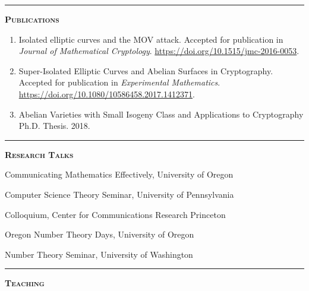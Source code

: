 \documentclass[12pt]{article}
\newcommand{\sectionheading}[1]
{
\bigskip %
\noindent
\hspace{-6.5mm}\textcolor{Gray}{\rule[.75mm]{21.5mm}{1mm}} %
\hspace{.2mm}	%
{\large{\textbf{\textsc{#1}}}} %
}
\newenvironment{date_section}
	{
	\vspace{-1ex}
	\leftmargini = 15ex
		\begin{itemize}[
			labelsep = *,
			labelwidth = 9ex,
			labelindent = 0ex,
			itemindent = !,
			font=\normalfont,
			align=parleft
		]{}
		\itemsep=-1.5mm
	}
	{\end{itemize}\vspace{-2ex}}
\newcommand{\yearmo}[2]{
	\item[
		{\makebox[1ex][r]{#1}}
		\hspace{1ex}
		{\makebox[1ex][l]{#2} }
		] }
\begin{document}
	\sectionheading{Publications}%

	\begin{enumerate}[itemsep=-1mm, leftmargin=24mm]

		\item
		{Isolated elliptic curves and the MOV attack}.
		Accepted for publication in \textit{Journal of Mathematical Cryptology}.
		\url{https://doi.org/10.1515/jmc-2016-0053}.

		\item
		{Super-Isolated Elliptic Curves and Abelian Surfaces in Cryptography}.
		Accepted for publication in \textit{Experimental Mathematics}.
		\url{https://doi.org/10.1080/10586458.2017.1412371}.

		\item
		{Abelian Varieties with Small Isogeny Class and Applications to Cryptography}
		Ph.D. Thesis. 2018.

	\end{enumerate}

	\sectionheading{Research Talks} %

	\begin{date_section}
		\yearmo{2018}{Jun.} %
		Communicating Mathematics Effectively,
		University of Oregon

		\yearmo{2018}{Feb.} %
		Computer Science Theory Seminar,
		University of Pennsylvania

		\yearmo{2018}{Feb.} %
		Colloquium,
		Center for Communications Research Princeton

		\yearmo{2017}{Oct.} %
		Oregon Number Theory Days,
		University of Oregon

		\yearmo{2017}{May.} %
		Number Theory Seminar,
		University of Washington

	\end{date_section}


	\sectionheading{Teaching}%
\end{document}
